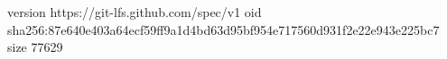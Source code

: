 version https://git-lfs.github.com/spec/v1
oid sha256:87e640e403a64ecf59ff9a1d4bd63d95bf954e717560d931f2e22e943e225bc7
size 77629
